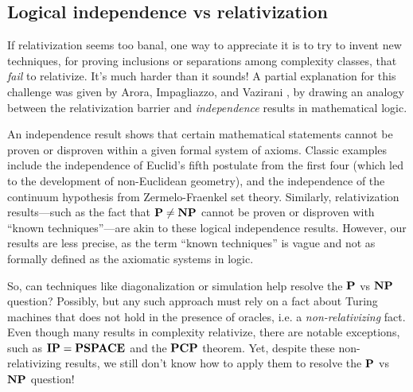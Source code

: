 \subsection{Logical independence vs relativization}
If relativization seems too banal, one way to appreciate it is to try to invent new techniques, for proving inclusions or separations among complexity classes, that \emph{fail} to relativize. It's much harder than it sounds! A partial explanation for this challenge was given by Arora, Impagliazzo, and Vazirani \cite{arora1992relativizing}, by drawing an analogy between the relativization barrier and \emph{independence} results in mathematical logic.

An independence result shows that certain mathematical statements cannot be proven or disproven within a given formal system of axioms. Classic examples include the independence of Euclid's fifth postulate from the first four (which led to the development of non-Euclidean geometry), and the independence of the continuum hypothesis from Zermelo-Fraenkel set theory. Similarly, relativization results—such as the fact that $\textbf{P} \neq \textbf{NP}$ cannot be proven or disproven with ``known techniques''—are akin to these logical independence results. However, our results are less precise, as the term ``known techniques'' is vague and not as formally defined as the axiomatic systems in logic.

So, can techniques like diagonalization or simulation help resolve the $\textbf{P}$ vs $\textbf{NP}$ question? Possibly, but any such approach must rely on a fact about Turing machines that does not hold in the presence of oracles, i.e. a \emph{non-relativizing} fact. Even though many results in complexity relativize, there are notable exceptions, such as $\textbf{IP} = \textbf{PSPACE}$ and the $\textbf{PCP}$ theorem. Yet, despite these non-relativizing results, we still don't know how to apply them to resolve the $\textbf{P}$ vs $\textbf{NP}$ question!

